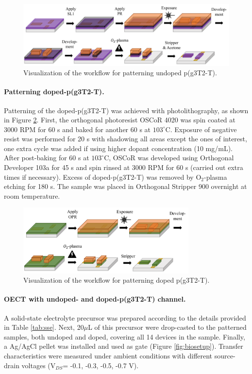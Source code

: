 \begin{figure}[ht]
	\centering
	\includegraphics[width=12cm]{Images/pdf/undoped-patterning.pdf}
	\caption{Visualization of the workflow for patterning undoped p(g3T2-T).}
	\label{fig:undopedpat}
\end{figure}

\paragraph{Patterning doped-p(g3T2-T).}Patterning of the doped-p(g3T2-T) was achieved with photolithography, as shown in Figure \ref{fig:dopedpat}. First, the orthogonal photoresist OSCoR 4020 was spin coated at 3000 RPM for 60 s and baked for another 60 s at $103^{\circ}$C. Exposure of negative resist was performed for 20 s with shadowing all areas except the ones of interest, one extra cycle was added if using higher dopant concentration (10 mg/mL). After post-baking for 60 s at $103^{\circ}$C, OSCoR was developed using Orthogonal Developer 103a for 45 s and spin rinsed at 3000 RPM for 60 s (carried out extra times if necessary). Excess of doped-p(g3T2-T) was removed by O$_{2}$-plasma etching for 180 s. The sample was placed in Orthogonal Stripper 900 overnight at room temperature.

\begin{figure}[ht]
	\centering
	\includegraphics[width=9cm]{Images/pdf/doped-patterning.pdf}
	\caption{Visualization of the workflow for patterning doped p(g3T2-T).}
	\label{fig:dopedpat}
\end{figure}

\paragraph{OECT with undoped- and doped-p(g3T2-T) channel.} A solid-state electrolyte precursor was prepared according to the details provided in Table \ref{tab:sse}. Next, 20$\mu$L of this precursor were drop-casted to the patterned samples, both undoped and doped, covering all 14 devices in the sample. Finally, a Ag/AgCl pellet was installed and used as gate (Figure \ref{fig:biosetup}). Transfer characteristics were measured under ambient conditions with different source-drain voltages (V$_{DS}$= -0.1, -0.3, -0.5, -0.7 V).

